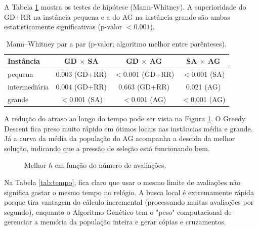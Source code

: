 A Tabela \ref{tab:pvalores} mostra os testes de hipótese (Mann-Whitney). A superioridade do GD+RR na instância pequena e a do AG na instância grande são ambas estatisticamente significativas (p-valor $< 0.001$).

\begin{table}[H]
\centering
\caption{Mann--Whitney par a par (p-valor; algoritmo melhor entre parênteses).}
\label{tab:pvalores}
\begin{tabular}{lccc}
\toprule
Instância     & GD $\times$ SA & GD $\times$ AG & SA $\times$ AG \\
\midrule
pequena & 0.003 (GD+RR) & $<$0.001 (GD+RR) & $<$0.001 (SA) \\
intermedi\'aria & 0.004 (GD+RR) & 0.663 (GD+RR) & 0.021 (AG) \\
grande & $<$0.001 (SA) & $<$0.001 (AG) & $<$0.001 (AG) \\
\bottomrule
\end{tabular}
\end{table}

A redução do atraso ao longo do tempo pode ser vista na Figura \ref{fig:convergencia}. O Greedy Descent fica preso muito rápido em ótimos locais nas instâncias média e grande. Já a curva da média da população do AG acompanha a descida da melhor solução, indicando que a pressão de seleção está funcionando bem.

\begin{figure}[t]
\centering
{}
\caption{Melhor $h$ em função do número de avaliações.}
\label{fig:convergencia}
\end{figure}

Na Tabela \ref{tab:tempo}, fica claro que usar o mesmo limite de avaliações não significa gastar o mesmo tempo no relógio. A busca local é extremamente rápida porque tira vantagem do cálculo incremental (processando muitas avaliações por segundo), enquanto o Algoritmo Genético tem o "peso" computacional de gerenciar a memória da população inteira e gerar cópias e cruzamentos.

